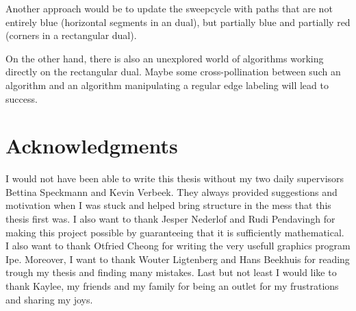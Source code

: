 Another approach would be to update the sweepcycle with paths that are not entirely blue (horizontal segments in an dual), but partially blue and partially red (corners in a rectangular dual).

On the other hand, there is also an unexplored world of algorithms working directly on the rectangular dual. Maybe some cross-pollination between such an algorithm and an algorithm manipulating a regular edge labeling will lead to success.

\newpage
\thispagestyle{plain}
\section*{Acknowledgments}
I would not have been able to write this thesis without my two daily supervisors Bettina Speckmann and Kevin Verbeek. They always provided suggestions and motivation when I was stuck and helped bring structure in the mess that this thesis first was. I also want to thank Jesper Nederlof and
Rudi Pendavingh for making this project possible by guaranteeing that it is sufficiently mathematical.
I also want to thank Otfried Cheong for writing the very usefull graphics program Ipe.
Moreover, I want to thank Wouter Ligtenberg and Hans Beekhuis for reading trough my thesis and finding many mistakes. Last but not least I would like to thank Kaylee, my friends and my family for being an outlet for my frustrations and sharing my joys.
